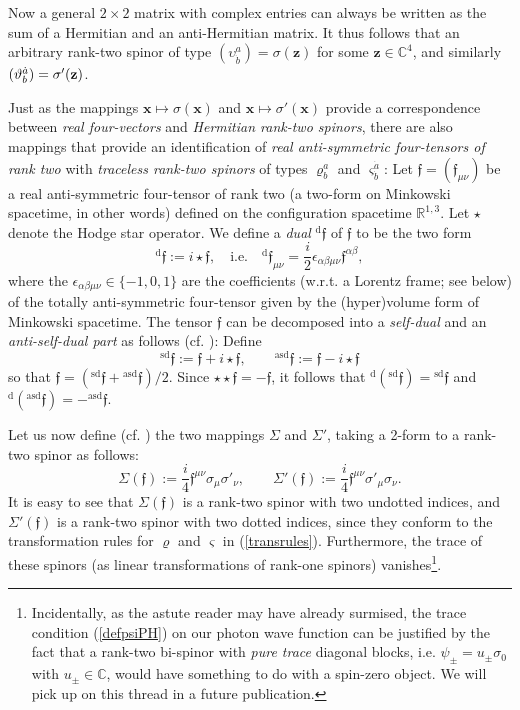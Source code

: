 \documentclass[12pt]{article}
\theoremstyle{definition}
\newcommand{\refeq}[1]{(\ref{#1})}
\numberwithin{equation}{section}
\newcommand{\ff}{\mathfrak{f}}
\newcommand{\bff}{\boldsymbol{\ff}}
\newcommand{\bx}{\mathbf{x}}
\newcommand{\bz}{\mathbf{z}}
\newcommand{\beq}{\begin{equation}}
\newcommand{\eeq}{\end{equation}}
\newcommand{\Cset}{{\mathbb C}}
\newcommand{\Rset}{{\mathbb R}}
\newcommand{\ep}{\epsilon}
\newcommand{\si}{\sigma}
\newcommand{\Si}{\Sigma}
\newcommand{\sdf}{{}^{\mathrm{sd}}\bff}
\newcommand{\asdf}{{}^{\mathrm{asd}}\bff}
\begin{document}
 Now a general $2\times 2$ matrix with complex entries can always be written as the sum of a Hermitian and an anti-Hermitian matrix. 
 It thus follows that an arbitrary rank-two spinor of type $(\upsilon^a_{\dot{b}}) = \si(\bz)$ for some $\bz \in \Cset^4$, and similarly 
$(\vartheta^{\dot{a}}_b) = \si\rq{}(\bz)$.

 Just as the mappings $\bx\mapsto \si(\bx)$ and $\bx\mapsto \si'(\bx)$ provide a correspondence between \emph{real four-vectors} and 
\emph{Hermitian rank-two spinors}, there are also mappings that provide an identification of 
\emph{real anti-symmetric four-tensors of rank two} with \emph{traceless rank-two spinors} of types $\varrho^a_b$ and
$\varsigma^{\dot{a}}_{\dot{b}}$: 
  Let  $\bff = (\ff_{\mu\nu})$ be a real anti-symmetric four-tensor of rank two (a two-form on Minkowski spacetime, 
in other words) defined on the configuration spacetime $\Rset^{1,3}$.
  Let $\star$ denote the Hodge star operator. 
We define a {\em dual} ${}^{\mathrm{d}}\bff$ of $\bff$ to be the two form 
\beq 
{}^{\mathrm{d}}\bff :=  i \star\bff,\quad{\mbox{i.e.}}\quad {}^{\mathrm{d}}\ff_{\mu\nu} = \frac{i}{2} \ep_{\alpha \beta \mu\nu} \ff^{\alpha\beta},
\eeq
where the $\ep_{\alpha \beta \mu\nu}\in\{-1,0,1\}$ are the coefficients (w.r.t. a Lorentz frame; see below) 
of the totally anti-symmetric four-tensor given by the (hyper)volume form of Minkowski spacetime.
 The tensor $\bff$ can be decomposed into a {\em self-dual} and an {\em anti-self-dual part} as follows (cf. \cite{Pen1976}): Define
\beq 
{}^{\mathrm{sd}}\bff := \bff + i \star\bff,\qquad {}^{\mathrm{asd}}\bff := \bff - i \star\bff
\eeq
so that $\bff = (\sdf + \asdf)/2$.
 Since $\star\star{\bff}=-\bff$, it follows that  ${}^{\mathrm{d}}\left(\sdf\right) = \sdf$ and ${}^{\mathrm{d}}\left(\asdf\right) = - \asdf $.

 Let us now define (cf. \cite{TamburiniVicino}) the two mappings $\Si$ and $\Si'$, taking a 2-form to a rank-two spinor as follows:
\beq \label{def:Siff}
\Si(\bff) := \frac{i}{4} \ff^{\mu\nu} \si_\mu \si'_\nu,\qquad 
\Si'(\bff) := \frac{i}{4} \ff^{\mu\nu} \si'_\mu \si_\nu.
\eeq
 It is easy to see that $\Si(\bff)$ is a rank-two spinor with two undotted indices, and $\Si'(\bff)$ is a rank-two spinor with two dotted 
indices, since they conform to the transformation rules for $\varrho$ and $\varsigma$ in \refeq{transrules}.
 Furthermore, the trace of these spinors (as linear transformations of rank-one spinors) vanishes\footnote{Incidentally, 
as the astute reader may have already surmised, the trace condition \refeq{defpsiPH} on our photon wave function can be 
justified by the fact that a rank-two bi-spinor with {\em pure trace} diagonal blocks, i.e. $\psi_\pm = u_\pm \si_0$ with 
$u_\pm \in \Cset$, would have something to do with a spin-zero object. We will pick up on this thread in a future publication.}.
\end{document}
